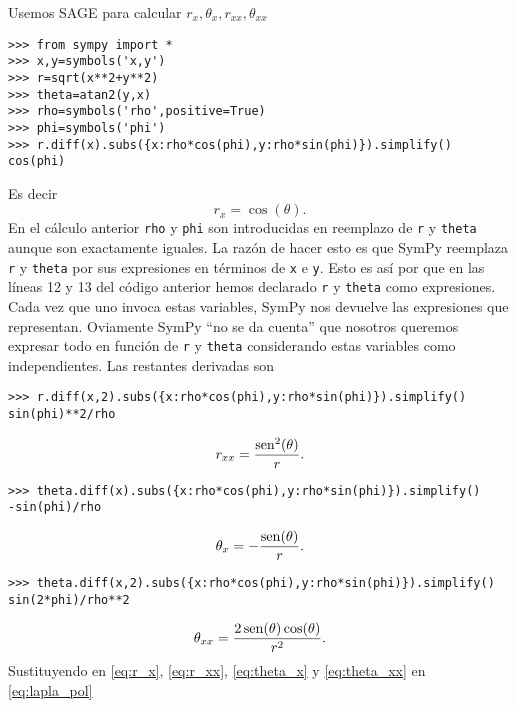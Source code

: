 Usemos SAGE para calcular $r_x,\theta_x,r_{xx},\theta_{xx}$

\begin{lstlisting}
>>> from sympy import *
>>> x,y=symbols('x,y')
>>> r=sqrt(x**2+y**2)
>>> theta=atan2(y,x)
>>> rho=symbols('rho',positive=True)
>>> phi=symbols('phi') 
>>> r.diff(x).subs({x:rho*cos(phi),y:rho*sin(phi)}).simplify()
cos(phi)
\end{lstlisting}
Es decir 
\begin{equation}\label{eq:r_x}r_x=\cos(\theta).
\end{equation}
En el cálculo anterior \texttt{rho} y \texttt{phi} son introducidas en reemplazo de \texttt{r} y \texttt{theta} aunque son exactamente iguales. La razón de hacer esto es que SymPy reemplaza \texttt{r} y \texttt{theta} por sus expresiones en términos de \texttt{x} e \texttt{y}. Esto es así por que en las líneas 12 y 13 del código anterior hemos declarado \texttt{r} y \texttt{theta} como expresiones. Cada vez que uno invoca estas variables, SymPy nos devuelve las expresiones que representan. Oviamente SymPy  ``no se da cuenta'' que nosotros queremos expresar todo en función de \texttt{r} y \texttt{theta} considerando estas variables como independientes. Las restantes derivadas son
\begin{lstlisting}
>>> r.diff(x,2).subs({x:rho*cos(phi),y:rho*sin(phi)}).simplify()
sin(phi)**2/rho
\end{lstlisting}

\begin{equation}\label{eq:r_xx}r_{xx}=\frac{\sen^2(\theta)}{r}.
\end{equation}

\begin{lstlisting}
>>> theta.diff(x).subs({x:rho*cos(phi),y:rho*sin(phi)}).simplify()
-sin(phi)/rho
\end{lstlisting}
\begin{equation}\label{eq:theta_x}\theta_x=-\frac{\sen(\theta)}{r}.
\end{equation}
\begin{lstlisting}
>>> theta.diff(x,2).subs({x:rho*cos(phi),y:rho*sin(phi)}).simplify()
sin(2*phi)/rho**2
\end{lstlisting}
\begin{equation}\label{eq:theta_xx}\theta_{xx}=\frac{2\sen(\theta)\cos(\theta)}{r^2}.
\end{equation}
Sustituyendo en \eqref{eq:r_x}, \eqref{eq:r_xx}, \eqref{eq:theta_x} y \eqref{eq:theta_xx} en \eqref{eq:lapla_pol}

